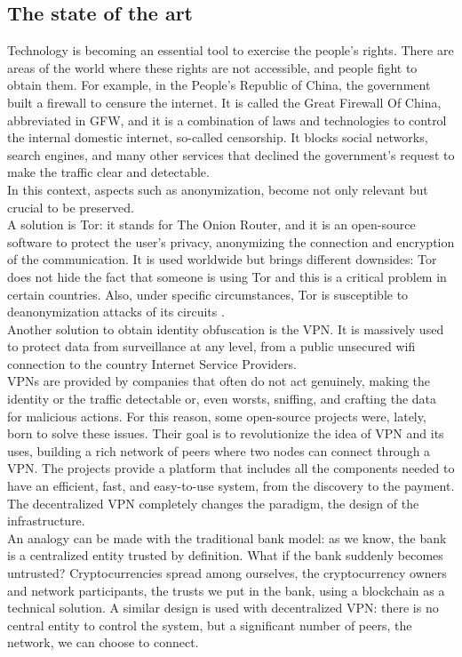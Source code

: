 \documentclass[12pt]{article}
\begin{document}
	\subsection{The state of the art}
	Technology is becoming an essential tool to exercise the people's rights. There are areas of the world where these rights are not accessible, and people fight to obtain them. For example, in the People's Republic of China, the government built a firewall to censure the internet. It is called the Great Firewall Of China, abbreviated in GFW, and it is a combination of laws and technologies to control the internal domestic internet, so-called censorship. It blocks social networks, search engines, and many other services that declined the government's request to make the traffic clear and detectable.\\
	In this context, aspects such as anonymization, become not only relevant but crucial to be preserved.\\
	A solution is Tor: it stands for The Onion Router, and it is an open-source software to protect the user's privacy, anonymizing the connection and encryption of the communication. It is used worldwide but brings different downsides: Tor does not hide the fact that someone is using Tor and this is a critical problem in certain countries. Also, under specific circumstances, Tor is susceptible to deanonymization attacks of its circuits \cite{DeanonymizingTorCircuits}.\\
	
	\bigbreak
	Another solution to obtain identity obfuscation is the VPN. It is massively used to protect data from surveillance at any level, from a public unsecured wifi connection to the country Internet Service Providers.\\
	VPNs are provided by companies that often do not act genuinely, making the identity or the traffic detectable or, even worsts, sniffing, and crafting the data for malicious actions. For this reason, some open-source projects were, lately, born to solve these issues. Their goal is to revolutionize the idea of VPN and its uses, building a rich network of peers where two nodes can connect through a VPN. The projects provide a platform that includes all the components needed to have an efficient, fast, and easy-to-use system, from the discovery to the payment.\\
	The decentralized VPN completely changes the paradigm, the design of the infrastructure.\\
	An analogy can be made with the traditional bank model: as we know, the bank is a centralized entity trusted by definition. What if the bank suddenly becomes untrusted? Cryptocurrencies spread among ourselves, the cryptocurrency owners and network participants, the trusts we put in the bank, using a blockchain as a technical solution. 
	A similar design is used with decentralized VPN: there is no central entity to control the system, but a significant number of peers, the network, we can choose to connect.
\end{document}
